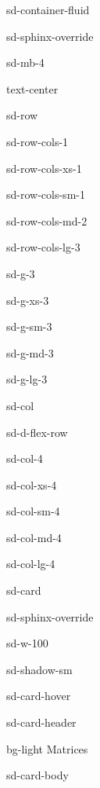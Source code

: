 \documentclass[letterpaper,10pt,english]{jupyterBook}
\begin{document}
\begin{sphinxuseclass}{sd-container-fluid}
\begin{sphinxuseclass}{sd-sphinx-override}
\begin{sphinxuseclass}{sd-mb-4}
\begin{sphinxuseclass}{text-center}
\begin{sphinxuseclass}{sd-row}
\begin{sphinxuseclass}{sd-row-cols-1}
\begin{sphinxuseclass}{sd-row-cols-xs-1}
\begin{sphinxuseclass}{sd-row-cols-sm-1}
\begin{sphinxuseclass}{sd-row-cols-md-2}
\begin{sphinxuseclass}{sd-row-cols-lg-3}
\begin{sphinxuseclass}{sd-g-3}
\begin{sphinxuseclass}{sd-g-xs-3}
\begin{sphinxuseclass}{sd-g-sm-3}
\begin{sphinxuseclass}{sd-g-md-3}
\begin{sphinxuseclass}{sd-g-lg-3}
\begin{sphinxuseclass}{sd-col}
\begin{sphinxuseclass}{sd-d-flex-row}
\begin{sphinxuseclass}{sd-col-4}
\begin{sphinxuseclass}{sd-col-xs-4}
\begin{sphinxuseclass}{sd-col-sm-4}
\begin{sphinxuseclass}{sd-col-md-4}
\begin{sphinxuseclass}{sd-col-lg-4}
\begin{sphinxuseclass}{sd-card}
\begin{sphinxuseclass}{sd-sphinx-override}
\begin{sphinxuseclass}{sd-w-100}
\begin{sphinxuseclass}{sd-shadow-sm}
\begin{sphinxuseclass}{sd-card-hover}
\begin{sphinxuseclass}{sd-card-header}
\begin{sphinxuseclass}{bg-light}
\sphinxAtStartPar
Matrices

\end{sphinxuseclass}
\end{sphinxuseclass}
\begin{sphinxuseclass}{sd-card-body}
\begin{figure}[htbp]
\centering

\noindent{}
\end{figure}


\end{sphinxuseclass}
\end{sphinxuseclass}
\end{sphinxuseclass}
\end{sphinxuseclass}
\end{sphinxuseclass}
\end{sphinxuseclass}
\end{sphinxuseclass}
\end{sphinxuseclass}
\end{sphinxuseclass}
\end{sphinxuseclass}
\end{sphinxuseclass}
\end{sphinxuseclass}
\end{sphinxuseclass}
\end{sphinxuseclass}
\end{sphinxuseclass}
\end{sphinxuseclass}
\end{sphinxuseclass}
\end{sphinxuseclass}
\end{sphinxuseclass}
\end{sphinxuseclass}
\end{sphinxuseclass}
\end{sphinxuseclass}
\end{sphinxuseclass}
\end{sphinxuseclass}
\end{sphinxuseclass}
\end{sphinxuseclass}
\end{sphinxuseclass}
\end{sphinxuseclass}
\end{document}
